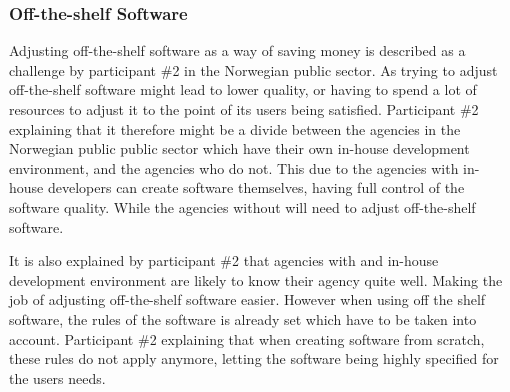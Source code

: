 \subsubsection{Off-the-shelf Software}
Adjusting off-the-shelf software as a way of saving money is described as a challenge by participant \#2 in the Norwegian public sector. As trying to adjust off-the-shelf software might lead to lower quality, or having to spend a lot of resources to adjust it to the point of its users being satisfied. Participant \#2 explaining that it therefore might be a divide between the agencies in the Norwegian public public sector which have their own in-house development environment, and the agencies who do not. This due to the agencies with in-house developers can create software themselves, having full control of the software quality. While the agencies without will need to adjust off-the-shelf software.


It is also explained by participant \#2 that agencies with and in-house development environment are likely to know their agency quite well. Making the job of adjusting off-the-shelf software easier. However when using off the shelf software, the rules of the software is already set which have to be taken into account. Participant \#2 explaining that when creating software from scratch, these rules do not apply anymore, letting the software being highly specified for the users needs.



